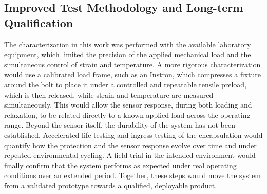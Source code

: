 \subsection{Improved Test Methodology and Long-term Qualification} \label{sec:improved_test}
The characterization in this work was performed with the available laboratory equipment, which limited the precision of the applied mechanical load and the simultaneous control of strain and temperature. A more rigorous characterization would use a calibrated load frame, such as an Instron, which compresses a fixture around the bolt to place it under a controlled and repeatable tensile preload, which is then released, while strain and temperature are measured simultaneously. This would allow the sensor response, during both loading and relaxation, to be related directly to a known applied load across the operating range. Beyond the sensor itself, the durability of the system has not been established. Accelerated life testing and ingress testing of the encapsulation would quantify how the protection and the sensor response evolve over time and under repeated environmental cycling. A field trial in the intended environment would finally confirm that the system performs as expected under real operating conditions over an extended period. Together, these steps would move the system from a validated prototype towards a qualified, deployable product.